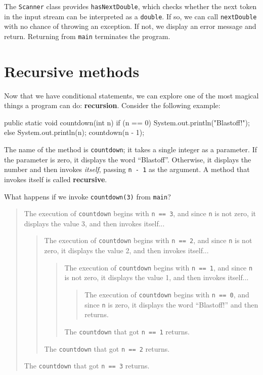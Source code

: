 \documentclass[12pt]{book}
\theoremstyle{exercise}
\newcommand{\java}[1]{\verb"#1"}
\begin{document}
The \java{Scanner} class provides \java{hasNextDouble}, which checks whether the next token in the input stream can be interpreted as a \java{double}.
If so, we can call \java{nextDouble} with no chance of throwing an exception.
If not, we display an error message and return.
Returning from \java{main} terminates the program.



\section{Recursive methods}
\label{recursion}


Now that we have conditional statements, we can explore one of the most magical things a program can do: {\bf recursion}.
Consider the following example:

\begin{code}
    public static void countdown(int n) {
        if (n == 0) {
            System.out.println("Blastoff!");
        } else {
            System.out.println(n);
            countdown(n - 1);
        }
    }
\end{code}

The name of the method is \java{countdown}; it takes a single integer as a parameter.
If the parameter is zero, it displays the word ``Blastoff''.
Otherwise, it displays the number and then invokes {\em itself}, passing \java{n - 1} as the argument.
A method that invokes itself is called {\bf recursive}.

What happens if we invoke \java{countdown(3)} from \java{main}?

\vspace{-1ex}
\begin{quote}
The execution of \java{countdown} begins with \java{n == 3}, and since \java{n} is not zero, it displays the value 3, and then invokes itself...
\begin{quote}
The execution of \java{countdown} begins with \java{n == 2}, and since \java{n} is not zero, it displays the value 2, and then invokes itself...
\begin{quote}
The execution of \java{countdown} begins with \java{n == 1}, and since \java{n} is not zero, it displays the value 1, and then invokes itself...
\begin{quote}
The execution of \java{countdown} begins with \java{n == 0}, and since \java{n} is zero, it displays the word ``Blastoff!'' and then returns.
\end{quote}
The \java{countdown} that got \java{n == 1} returns.
\end{quote}
The \java{countdown} that got \java{n == 2} returns.
\end{quote}
The \java{countdown} that got \java{n == 3} returns.
\end{quote}
\vspace{-1ex}
\end{document}
